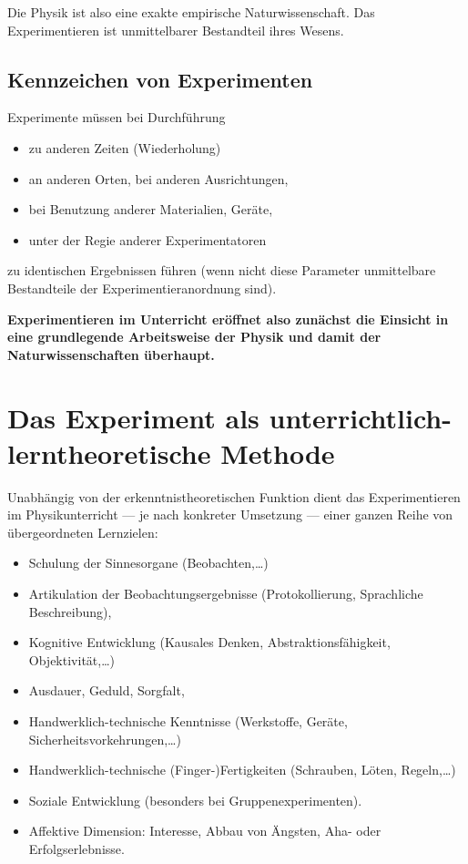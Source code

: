 Die Physik ist also eine exakte empirische Naturwissenschaft.
Das Experimentieren ist unmittelbarer Bestandteil ihres Wesens.

\subsection{Kennzeichen von Experimenten}

Experimente m\"{u}ssen bei Durchf\"{u}hrung
\begin{itemize}
	\item
	zu anderen Zeiten (Wiederholung)
	\item
	an anderen Orten, bei anderen Ausrichtungen,
	\item
	bei Benutzung anderer Materialien, Ger\"{a}te,
	\item
	unter der Regie anderer Experimentatoren
\end{itemize}
zu identischen Ergebnissen f\"{u}hren
(wenn nicht diese Parameter unmittelbare Bestandteile der
Experimentieranordnung sind).

\bip
{ \bf
Experimentieren im Unterricht er\"{o}ffnet also zun\"{a}chst die
Einsicht in eine grundlegende Arbeitsweise der Physik und
damit der Naturwissenschaften \"{u}berhaupt.
}

\bip\bip
\section{Das Experiment als unterrichtlich-lerntheoretische
                                          Methode}

Unabh\"{a}ngig von der erkenntnistheoretischen Funktion dient das
Experimentieren im Physikunterricht
--- je nach konkreter Umsetzung ---
einer ganzen Reihe von \"{u}bergeordneten Lernzielen:

\begin{itemize}
	\item
	Schulung der Sinnesorgane (Beobachten,\dots)
	\item
	Artikulation der Beobachtungsergebnisse (Protokollierung,
	Sprachliche Beschreibung),
	\item
	Kognitive Entwicklung (Kausales Denken, Abstraktionsf\"{a}higkeit,
	                                Objektivit\"{a}t,\dots)
	\item
	Ausdauer, Geduld, Sorgfalt,
	\item
	Handwerklich-technische Kenntnisse
	(Werkstoffe, Ger\"{a}te, Sicherheitsvorkehrungen,\dots)
	\item
	Handwerklich-technische (Finger-)Fertigkeiten
	(Schrauben, L\"{o}ten, Regeln,\dots)
	\item
	Soziale Entwicklung (besonders bei Gruppenexperimenten).
	\item
	Affektive Dimension: Interesse, Abbau von \"{A}ngsten,
	Aha-  oder Erfolgserlebnisse.
\end{itemize}

